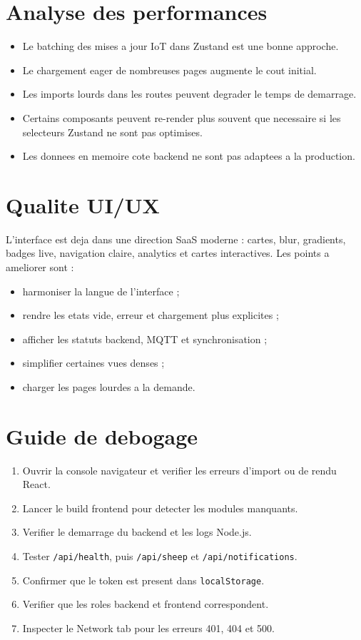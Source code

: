 \documentclass[11pt,a4paper]{article}
\begin{document}
\section{Analyse des performances}
\begin{itemize}[leftmargin=1.2cm]
  \item Le batching des mises a jour IoT dans Zustand est une bonne approche.
  \item Le chargement eager de nombreuses pages augmente le cout initial.
  \item Les imports lourds dans les routes peuvent degrader le temps de demarrage.
  \item Certains composants peuvent re-render plus souvent que necessaire si les selecteurs Zustand ne sont pas optimises.
  \item Les donnees en memoire cote backend ne sont pas adaptees a la production.
\end{itemize}

\section{Qualite UI/UX}
L'interface est deja dans une direction SaaS moderne : cartes, blur, gradients, badges live, navigation claire, analytics et cartes interactives. Les points a ameliorer sont :
\begin{itemize}[leftmargin=1.2cm]
  \item harmoniser la langue de l'interface ;
  \item rendre les etats vide, erreur et chargement plus explicites ;
  \item afficher les statuts backend, MQTT et synchronisation ;
  \item simplifier certaines vues denses ;
  \item charger les pages lourdes a la demande.
\end{itemize}

\section{Guide de debogage}
\begin{enumerate}[leftmargin=1.2cm]
  \item Ouvrir la console navigateur et verifier les erreurs d'import ou de rendu React.
  \item Lancer le build frontend pour detecter les modules manquants.
  \item Verifier le demarrage du backend et les logs Node.js.
  \item Tester \texttt{/api/health}, puis \texttt{/api/sheep} et \texttt{/api/notifications}.
  \item Confirmer que le token est present dans \texttt{localStorage}.
  \item Verifier que les roles backend et frontend correspondent.
  \item Inspecter le Network tab pour les erreurs 401, 404 et 500.
\end{enumerate}
\end{document}
